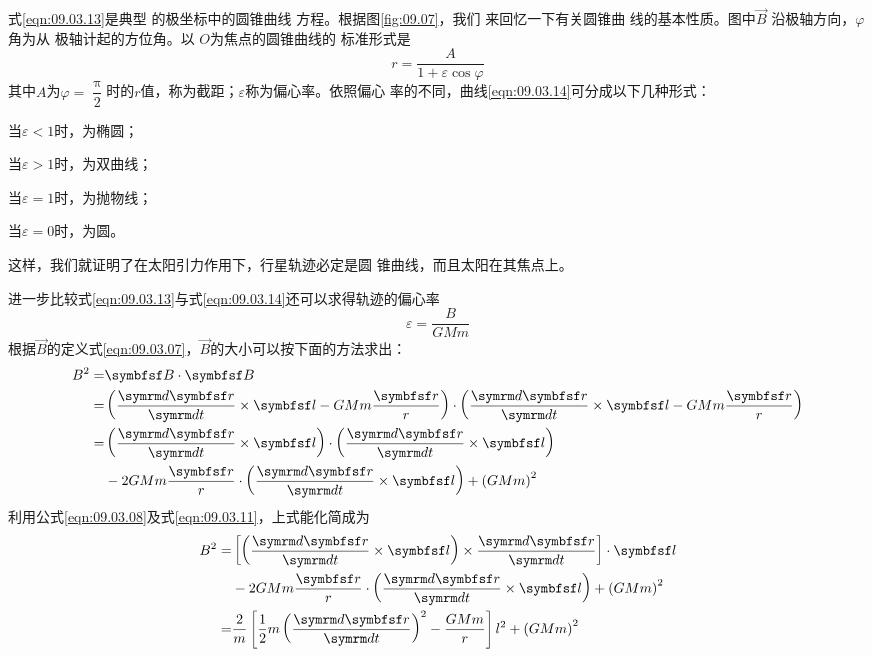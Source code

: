 式\eqref{eqn:09.03.13}是典型
的极坐标中的圆锥曲线
方程。根据图\ref{fig:09.07}，我们
来回忆一下有关圆锥曲
线的基本性质。图中$ \vec{B} $
沿极轴方向，$ \varphi $角为从
极轴计起的方位角。以
$ O $为焦点的圆锥曲线的
标准形式是
\begin{equation}\label{eqn:09.03.14}
  r = \frac { A } { 1 + \varepsilon \cos \varphi }
\end{equation}
其中$ A $为$ \varphi = \dfrac { \uppi } { 2 } $时的$ r $值，称为截距；$ \varepsilon $称为偏心率。依照偏心
率的不同，曲线\eqref{eqn:09.03.14}可分成以下几种形式：

当$ \varepsilon < 1 $时，为椭圆；

当$ \varepsilon > 1 $时，为双曲线；

当$ \varepsilon = 1 $时，为抛物线；

当$ \varepsilon = 0 $时，为圆。

这样，我们就证明了在太阳引力作用下，行星轨迹必定是圆
锥曲线，而且太阳在其焦点上。

进一步比较式\eqref{eqn:09.03.13}与式\eqref{eqn:09.03.14}还可以求得轨迹的偏心率
\begin{equation}\label{eqn:09.03.15}
  \varepsilon = \frac { B } { G M m }
\end{equation}
根据$ \vec{B} $的定义式\eqref{eqn:09.03.07}，$\vec{B}$的大小可以按下面的方法求出：
\begin{equation*}
  \begin{split}
    B ^ { 2 } =& \vec{B} \cdot \vec{B} \\
    =& \left( \frac { \dif \vec{r} } { \dif t } \times \vec{l} - G M m \frac { \vec{r} } { r } \right) \cdot \left( \frac { \dif \vec{r} } { \dif t } \times \vec{l} - G M m \frac { \vec{r} } { r } \right) \\
    =& \left( \frac { \dif \vec{r} } { \dif t } \times \vec{l} \right) \cdot \left( \frac { \dif \vec{r} } { \dif t } \times \vec{l} \right) \\
    & - 2 G M m \frac { \vec{r} } { r } \cdot \left( \frac { \dif \vec{r} } { \dif t } \times \vec{l} \right) + \left( G M m \right) ^ { 2 }
  \end{split}
\end{equation*}
利用公式\eqref{eqn:09.03.08}及式\eqref{eqn:09.03.11}，上式能化简成为
\begin{equation*}
  \begin{split}
    B ^ { 2 } =& \left[ \left( \frac { \dif \vec{r} } { \dif t } \times \vec{l} \right) \times \frac { \dif \vec{r} } { \dif t } \right] \cdot \vec{ l } \\
    &- 2 G M m \frac { \vec{r} } { r } \cdot \left( \frac { \dif \vec{r} } { \dif t } \times \vec{l} \right) + \left( G M m \right) ^ { 2 } \\
    =& \frac { 2 } { m } \left[ \frac { 1 } { 2 } m \left( \frac { \dif \vec{r} } { \dif t } \right) ^ { 2 } - \frac { G M m } { r } \right] l ^ { 2 } + \left( G M m \right) ^ { 2 }
  \end{split}
\end{equation*}

